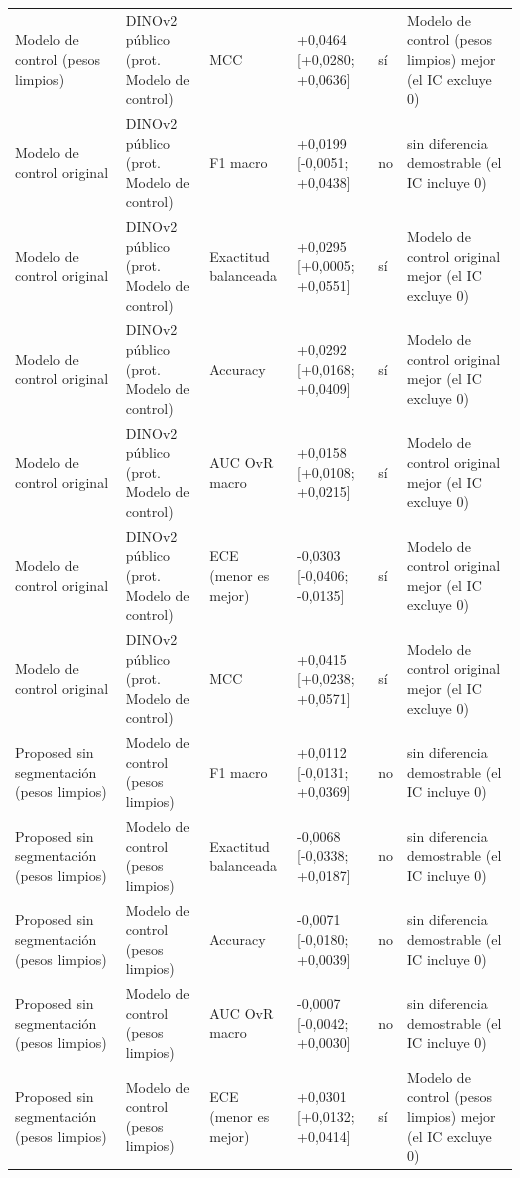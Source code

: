 \begin{longtable}{@{}llllll@{}}
Modelo de control (pesos limpios) & DINOv2 público (prot. Modelo de control) & MCC & +0,0464 [+0,0280; +0,0636] & sí & Modelo de control (pesos limpios) mejor (el IC excluye 0) \\
Modelo de control original & DINOv2 público (prot. Modelo de control) & F1 macro & +0,0199 [-0,0051; +0,0438] & no & sin diferencia demostrable (el IC incluye 0) \\
Modelo de control original & DINOv2 público (prot. Modelo de control) & Exactitud balanceada & +0,0295 [+0,0005; +0,0551] & sí & Modelo de control original mejor (el IC excluye 0) \\
Modelo de control original & DINOv2 público (prot. Modelo de control) & Accuracy & +0,0292 [+0,0168; +0,0409] & sí & Modelo de control original mejor (el IC excluye 0) \\
Modelo de control original & DINOv2 público (prot. Modelo de control) & AUC OvR macro & +0,0158 [+0,0108; +0,0215] & sí & Modelo de control original mejor (el IC excluye 0) \\
Modelo de control original & DINOv2 público (prot. Modelo de control) & ECE (menor es mejor) & -0,0303 [-0,0406; -0,0135] & sí & Modelo de control original mejor (el IC excluye 0) \\
Modelo de control original & DINOv2 público (prot. Modelo de control) & MCC & +0,0415 [+0,0238; +0,0571] & sí & Modelo de control original mejor (el IC excluye 0) \\
Proposed sin segmentación (pesos limpios) & Modelo de control (pesos limpios) & F1 macro & +0,0112 [-0,0131; +0,0369] & no & sin diferencia demostrable (el IC incluye 0) \\
Proposed sin segmentación (pesos limpios) & Modelo de control (pesos limpios) & Exactitud balanceada & -0,0068 [-0,0338; +0,0187] & no & sin diferencia demostrable (el IC incluye 0) \\
Proposed sin segmentación (pesos limpios) & Modelo de control (pesos limpios) & Accuracy & -0,0071 [-0,0180; +0,0039] & no & sin diferencia demostrable (el IC incluye 0) \\
Proposed sin segmentación (pesos limpios) & Modelo de control (pesos limpios) & AUC OvR macro & -0,0007 [-0,0042; +0,0030] & no & sin diferencia demostrable (el IC incluye 0) \\
Proposed sin segmentación (pesos limpios) & Modelo de control (pesos limpios) & ECE (menor es mejor) & +0,0301 [+0,0132; +0,0414] & sí & Modelo de control (pesos limpios) mejor (el IC excluye 0) \\

\end{longtable}
